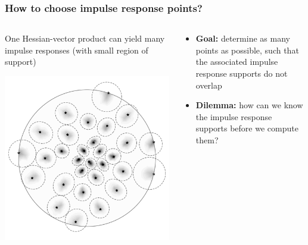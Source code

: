 \documentclass[10pt,final,xcolor=dvipsnames,aspect ratio=169]{beamer}
\begin{document}
\begin{frame}[t]
	\frametitle{How to choose impulse response points?}
	
	\begin{columns}
		\begin{column}{0.5\columnwidth}
			One Hessian-vector product can yield many impulse responses (with small region of support)
		\begin{center}
			\includegraphics[width=0.75\columnwidth]{impulse_batch2.png} 
		\end{center}
	    \end{column}
    \begin{column}{0.49\columnwidth}
    	\only<2>
    	{ 
		\begin{itemize}
			\item \textbf{Goal:} determine as many points as possible, such that the associated impulse response supports do not overlap
			\item \textbf{Dilemma:} how can we know the impulse response supports before we compute them?
		\end{itemize}
	    }
	\end{column} 
	\end{columns}

\end{frame}
\end{document}
